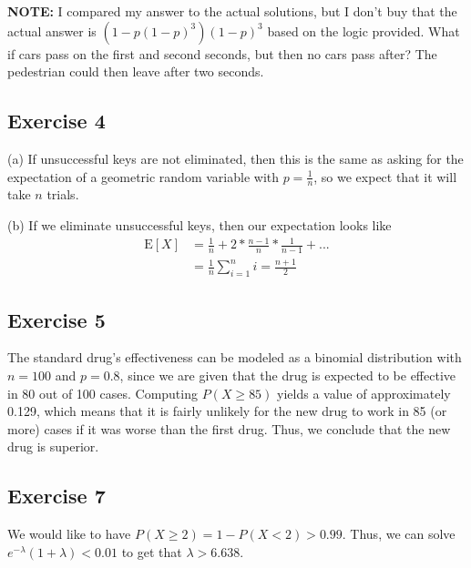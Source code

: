 \textbf{NOTE:} I compared my answer to the actual solutions, but I don't buy that the actual
answer is $(1 - p (1 - p)^3) (1 - p)^3$ based on the logic provided. What if cars pass on the first and second
seconds, but then no cars pass after? The pedestrian could then leave after two seconds.

\subsection{Exercise 4}
(a) If unsuccessful keys are not eliminated, then this is the same as asking for the expectation of a 
geometric random variable with $p = \frac{1}{n}$, so we expect that it will take $n$ trials.

(b) If we eliminate unsuccessful keys, then our expectation looks like  
\begin{align*}
        \mathrm{E} [X] &= \frac{1}{n} + 2 * \frac{n - 1}{n} * \frac{1}{n - 1} + ... \\
                       &= \frac{1}{n} \sum_{i = 1}^n i = \frac{n + 1}{2}
\end{align*}

\subsection{Exercise 5}
The standard drug's effectiveness can be modeled as a binomial distribution with $n = 100$ and $p = 0.8$, since
we are given that the drug is expected to be effective in 80 out of 100 cases. Computing $P(X \geq 85)$ yields
a value of approximately 0.129, which means that it is fairly unlikely for the new drug to work in 85
(or more) cases if it was worse than the first drug. Thus, we conclude that the new drug is superior.

\subsection{Exercise 7}
We would like to have $P(X \geq 2) = 1 - P(X < 2) > 0.99$. Thus, we can solve 
$e^{-\lambda} (1 + \lambda) < 0.01$ to get that $\lambda > 6.638$.
